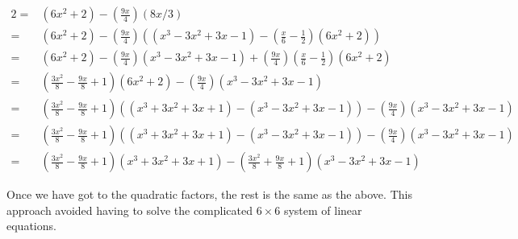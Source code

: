 \begin{align*}
   2 =& (6x^2 + 2) - \left(\frac{9x}{4}\right)(8x/3) \\
     =& (6x^2 + 2) - \left(\frac{9x}{4}\right)((x^3 - 3x^2 + 3x - 1) -  \left(\frac{x}{6} - \frac{1}{2}\right) (6x^2 + 2)) \\
     =& (6x^2 + 2) - \left(\frac{9x}{4}\right)(x^3 - 3x^2 + 3x - 1) + \left(\frac{9x}{4}\right) \left(\frac{x}{6} - \frac{1}{2}\right) (6x^2 + 2) \\
     =& \left(\frac{3x^2}{8} - \frac{9x}{8} + 1\right) (6x^2 + 2) - \left(\frac{9x}{4}\right)(x^3 - 3x^2 + 3x - 1)  \\
     =& \left(\frac{3x^2}{8} - \frac{9x}{8} + 1\right) ((x^3 + 3x^2 + 3x + 1) - (x^3 - 3x^2 + 3x - 1)) - \left(\frac{9x}{4}\right)(x^3 - 3x^2 + 3x - 1)  \\
     =& \left(\frac{3x^2}{8} - \frac{9x}{8} + 1\right) ((x^3 + 3x^2 + 3x + 1) - (x^3 - 3x^2 + 3x - 1)) - \left(\frac{9x}{4}\right)(x^3 - 3x^2 + 3x - 1)  \\
     =& \left(\frac{3x^2}{8} - \frac{9x}{8} + 1\right) (x^3 + 3x^2 + 3x + 1) - \left(\frac{3x^2}{8} + \frac{9x}{8} + 1\right) (x^3 - 3x^2 + 3x - 1)
\end{align*}

Once we have got to the quadratic factors, the rest is the same as the above. This approach avoided having to solve the complicated $ 6 \times 6 $ system of linear equations.